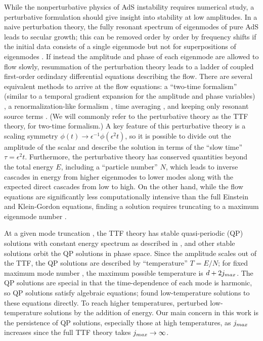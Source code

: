 \documentclass[../PhD.tex]{subfiles}
\begin{document}
While the nonperturbative physics of AdS instability requires numerical study, a perturbative formulation should give insight into stability at low amplitudes.  In a naive perturbation theory, the fully resonant spectrum of eigenmodes of pure AdS leads to secular growth; this can be removed order by order by frequency shifts if the initial data consists of a single eigenmode but not for superpositions of eigenmodes \cite{1109.1825}.  If instead the amplitude and phase of each eigenmode are allowed to flow slowly, resummation of the perturbation theory leads to a ladder of coupled first-order ordindary differential equations describing the flow.  There are several equivalent methods to arrive at the flow equations: a ``two-time formalism'' (similar to a temporal gradient expansion for the amplitude and phase variables) \cite{1403.6471}, a renormalization-like formalism \cite{1407.6273,1412.3249}, time averaging \cite{1412.3249,1510.07836}, and keeping only resonant source terms \cite{1506.03519}.  (We will commonly refer to the perturbative theory as the TTF theory, for two-time formalism.)  A key feature of this perturbative theory is a scaling symmetry $\phi(t)\to \epsilon^{-1}\phi(\epsilon^2 t)$, so it is possible to divide out the amplitude of the scalar and describe the solution in terms of the ``slow time'' $\tau=\epsilon^2 t$.  Furthermore, the perturbative theory has conserved quantities beyond the total energy $E$, including a ``particle number'' $N$, which leads to inverse cascades in energy from higher eigenmodes to lower modes along with the expected direct cascades from low to high.  On the other hand, while the flow equations are significantly less computationally intensive than the full Einstein and Klein-Gordon equations, finding a solution requires truncating to a maximum eigenmode number \jm.

At a given mode truncation \jm, the TTF theory has stable quasi-periodic (QP) solutions with constant energy spectrum as described in \cite{1403.6471,1507.08261}, and other stable solutions orbit the QP solutions in phase space.  Since the amplitude scales out of the TTF, the QP solutions are described by ``temperature'' $T=E/N$; for fixed maximum mode number \jm, the maximum possible temperature is $d+2j_{max}$. The QP solutions are special in that the time-dependence of each mode is harmonic, so QP solutions satisfy algebraic equations; \cite{1507.08261} found low-temperature solutions to these equations directly.  To reach higher temperatures, \cite{1507.08261} perturbed low-temperature solutions by the addition of energy.  Our main concern in this work is the persistence of QP solutions, especially those at high temperatures, as $j_{max}$ increases since the full TTF theory takes $j_{max}\to\infty$.
\end{document}
